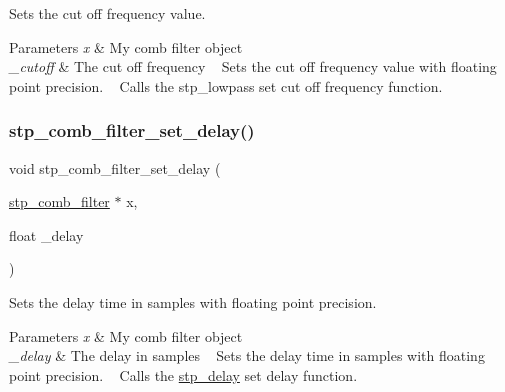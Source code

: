 Sets the cut off frequency value. ~\newline
 


\begin{DoxyParams}{Parameters}
{\em x} & My comb filter object ~\newline
 \\
\hline
{\em \+\_\+cutoff} & The cut off frequency ~\newline
 Sets the cut off frequency value with floating point precision. ~\newline
 Calls the stp\+\_\+lowpass set cut off frequency function. ~\newline
 \\
\hline
\end{DoxyParams}
\mbox{\label{structstp__comb__filter_a85a221fad983cb07992599fb489b6dca}} 
\subsubsection{\texorpdfstring{stp\+\_\+comb\+\_\+filter\+\_\+set\+\_\+delay()}{stp\_comb\_filter\_set\_delay()}}
{\footnotesize\ttfamily void stp\+\_\+comb\+\_\+filter\+\_\+set\+\_\+delay (\begin{DoxyParamCaption}\item[{\hyperlink{structstp__comb__filter}{stp\+\_\+comb\+\_\+filter} $\ast$}]{x,  }\item[{float}]{\+\_\+delay }\end{DoxyParamCaption})\hspace{0.3cm}{\ttfamily [related]}}



Sets the delay time in samples with floating point precision. ~\newline
 


\begin{DoxyParams}{Parameters}
{\em x} & My comb filter object ~\newline
 \\
\hline
{\em \+\_\+delay} & The delay in samples ~\newline
 Sets the delay time in samples with floating point precision. ~\newline
 Calls the \hyperlink{structstp__delay}{stp\+\_\+delay} set delay function. ~\newline
 \\
\hline
\end{DoxyParams}
\mbox{\label{structstp__comb__filter_a552185fbb2f8236961c25ed67ed62033}} 
